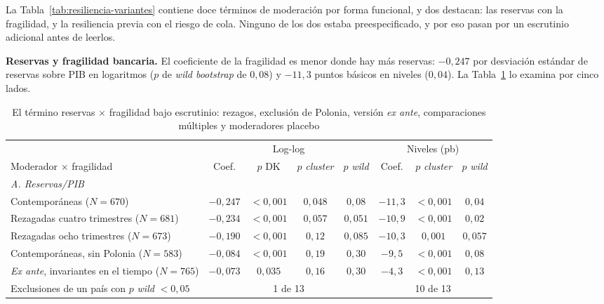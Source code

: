 La Tabla~\ref{tab:resiliencia-variantes} contiene doce términos de moderación por forma funcional, y dos destacan: las reservas con la fragilidad, y la resiliencia previa con el riesgo de cola. Ninguno de los dos estaba preespecificado, y por eso pasan por un escrutinio adicional antes de leerlos.

\textbf{Reservas y fragilidad bancaria.} El coeficiente de la fragilidad es menor donde hay más reservas: $-0{,}247$ por desviación estándar de reservas sobre PIB en logaritmos ($p$ de \textit{wild bootstrap} de $0{,}08$) y $-11{,}3$ puntos básicos en niveles ($0{,}04$). La Tabla~\ref{tab:reservas} lo examina por cinco lados.

\begin{table}[htbp]
\centering
\small
\caption[Reservas y fragilidad bancaria bajo escrutinio]{El término reservas $\times$ fragilidad bajo escrutinio: rezagos, exclusión de Polonia, versión \textit{ex ante}, comparaciones múltiples y moderadores placebo}
\label{tab:reservas}
\begin{adjustbox}{max width=\linewidth}
\begin{tabular}{l cccc ccc}
\toprule
 & \multicolumn{4}{c}{Log-log} & \multicolumn{3}{c}{Niveles (pb)} \\
\cmidrule(lr){2-5}\cmidrule(lr){6-8}
Moderador $\times$ fragilidad & Coef. & $p$ DK & $p$ \textit{cluster} & $p$ \textit{wild} & Coef. & $p$ \textit{cluster} & $p$ \textit{wild} \\
\midrule
\multicolumn{8}{l}{\textit{A. Reservas/PIB}} \\
\quad Contemporáneas ($N=670$) & $-0{,}247$ & $<0{,}001$ & $0{,}048$ & $0{,}08$ & $-11{,}3$ & $<0{,}001$ & $0{,}04$ \\
\quad Rezagadas cuatro trimestres ($N=681$) & $-0{,}234$ & $<0{,}001$ & $0{,}057$ & $0{,}051$ & $-10{,}9$ & $<0{,}001$ & $0{,}02$ \\
\quad Rezagadas ocho trimestres ($N=673$) & $-0{,}190$ & $<0{,}001$ & $0{,}12$ & $0{,}085$ & $-10{,}3$ & $0{,}001$ & $0{,}057$ \\
\quad Contemporáneas, sin Polonia ($N=583$) & $-0{,}084$ & $<0{,}001$ & $0{,}19$ & $0{,}30$ & $-9{,}5$ & $<0{,}001$ & $0{,}08$ \\
\quad \textit{Ex ante}, invariantes en el tiempo ($N=765$) & $-0{,}073$ & $0{,}035$ & $0{,}16$ & $0{,}30$ & $-4{,}3$ & $<0{,}001$ & $0{,}13$ \\
\quad Exclusiones de un país con $p$ \textit{wild} $<0{,}05$ & \multicolumn{4}{c}{1 de 13} & \multicolumn{3}{c}{10 de 13} \\

\end{tabular}
\end{adjustbox}
\end{table}
